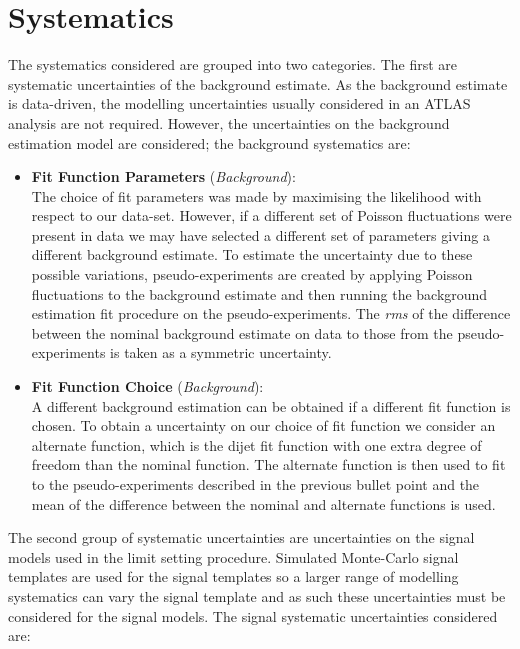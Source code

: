 \section{Systematics}
\label{sec:lim-syst}

The systematics considered are grouped into two categories.
The first are systematic uncertainties of the background estimate.
As the background estimate is data-driven,
the modelling uncertainties usually considered in an ATLAS analysis are not required.
However, the uncertainties on the background estimation model are considered;
the background systematics are:

\begin{itemize}[leftmargin=*]
\item \textbf{Fit Function Parameters} \hspace{1mm} (\textit{Background}):\\
  The choice of fit parameters was made by maximising the likelihood with respect to our data-set.
  However, if a different set of Poisson fluctuations were present in data we may have selected a different
  set of parameters giving a different background estimate.
  To estimate the uncertainty due to these possible variations, pseudo-experiments are created by applying Poisson
  fluctuations to the background estimate and then running the background estimation fit procedure on the pseudo-experiments.
  The \textit{rms} of the difference between the nominal background estimate on data to those from the pseudo-experiments is
  taken as a symmetric uncertainty. \vspace{0.5em}
\item\textbf{Fit Function Choice}  \hspace{1mm} (\textit{Background}):\\
  A different background estimation can be obtained if a different fit function is chosen.
  To obtain a uncertainty on our choice of fit function we consider an alternate function,
  which is the dijet fit function with one extra degree of freedom than the nominal function.
  The alternate function is then used to fit to the pseudo-experiments described in the previous bullet point
  and the mean of the difference between the nominal and alternate functions is used.
  \vspace{0.5em}
\end{itemize}

The second group of systematic uncertainties are uncertainties on the signal models used in the limit setting procedure.
Simulated Monte-Carlo signal templates are used for the signal templates
so a larger range of modelling systematics can vary the signal template
and as such these uncertainties must be considered for the signal models.
The signal systematic uncertainties considered are:


